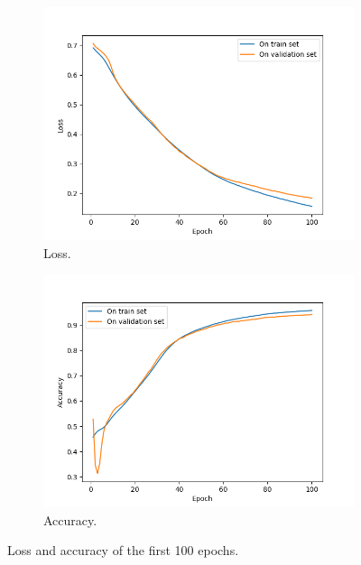 \documentclass[12pt, a4paper]{article}
\begin{document}
	\begin{figure}[h!]
	  \centering
	  \begin{subfigure}[b]{0.45\linewidth}
	    \includegraphics[width=\linewidth]{Figure_1.png}
	    \caption{Loss.}
	  \end{subfigure}
	  \begin{subfigure}[b]{0.45\linewidth}
	    \includegraphics[width=\linewidth]{Figure_2.png}
	    \caption{Accuracy.}
	  \end{subfigure}
	  \caption{Loss and accuracy of the first 100 epochs.}
	  \label{fig:training}
	\end{figure}
\end{document}
